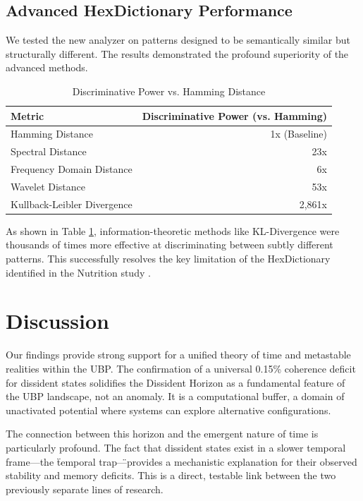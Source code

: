 \documentclass[12pt, a4paper]{article}
\begin{document}
\subsection{Advanced HexDictionary Performance}
We tested the new analyzer on patterns designed to be semantically similar but structurally different. The results demonstrated the profound superiority of the advanced methods.

\begin{table}[h!]
\centering
\caption{Discriminative Power vs. Hamming Distance}
\label{tab:hex_power}
\begin{tabular}{@{}lr@{}}
\toprule
\textbf{Metric} & \textbf{Discriminative Power (vs. Hamming)} \\
\midrule
Hamming Distance & 1x (Baseline) \\
Spectral Distance & 23x \\
Frequency Domain Distance & 6x \\
Wavelet Distance & 53x \\
Kullback-Leibler Divergence & 2,861x \\
\bottomrule
\end{tabular}
\end{table}

As shown in Table \ref{tab:hex_power}, information-theoretic methods like KL-Divergence were thousands of times more effective at discriminating between subtly different patterns. This successfully resolves the key limitation of the HexDictionary identified in the Nutrition study \cite{nutrition_study}.

\section{Discussion}
Our findings provide strong support for a unified theory of time and metastable realities within the UBP. The confirmation of a universal 0.15\% coherence deficit for dissident states solidifies the Dissident Horizon as a fundamental feature of the UBP landscape, not an anomaly. It is a computational buffer, a domain of unactivated potential where systems can explore alternative configurations.

The connection between this horizon and the emergent nature of time is particularly profound. The fact that dissident states exist in a slower temporal frame—the \"temporal trap\"—provides a mechanistic explanation for their observed stability and memory deficits. This is a direct, testable link between the two previously separate lines of research.
\end{document}
